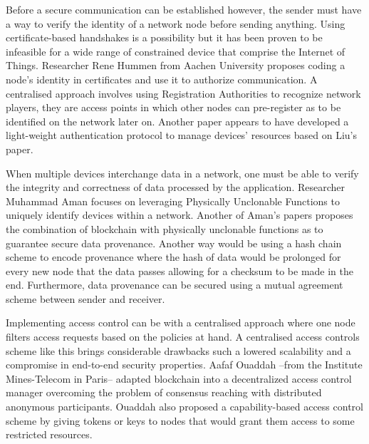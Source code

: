 \documentclass[14]{article}
\begin{document}
Before a secure communication can be established however, the sender must have a way to verify the identity of a network node before sending anything. Using certificate-based handshakes\cite{hummen2014site} is a possibility but it has been proven to be infeasible for a wide range of constrained device that comprise the Internet of Things. Researcher Rene Hummen from Aachen University proposes coding a node's identity in certificates \cite{hummen2013towards} and use it to authorize communication. A centralised approach involves using Registration Authorities\cite{liu2012authentication} to recognize network players, they are access points in which other nodes can pre-register as to be identified on the network later on. Another paper\cite{jan2014robust} appears to have developed a light-weight authentication protocol to manage devices' resources based on Liu's paper. 

When multiple devices interchange data in a network, one must be able to verify the integrity and correctness of data processed by the application. Researcher Muhammad Aman focuses on leveraging Physically Unclonable Functions \cite{aman2017secure} to uniquely identify devices within a network. Another of Aman's papers\cite{javaid2018blockpro} proposes the combination of blockchain with physically unclonable functions as to guarantee secure data provenance.
Another way would be using a hash chain scheme\cite{suhail2018data} to encode provenance where the hash of data would be prolonged for every new node that the data passes allowing for a checksum to be made in the end. Furthermore, data provenance can be secured using a mutual agreement scheme\cite{rangwala2016mutual} between sender and receiver.

Implementing access control can be with a centralised approach\cite{hernandez2013distributed} where one node filters access requests based on the policies at hand. A centralised access controls scheme like this brings considerable drawbacks\cite{ouaddah2017towards} such a lowered scalability and a compromise in end-to-end security properties. Aafaf Ouaddah --from the Institute Mines-Telecom in Paris-- adapted blockchain \cite{ouaddah2016fairaccess} into a decentralized access control manager overcoming the problem of consensus reaching with distributed anonymous participants. Ouaddah also proposed a capability-based access control scheme\cite{ouaddah2017access} by giving tokens or keys to nodes that would grant them access to some restricted resources. 
\newline
\end{document}
